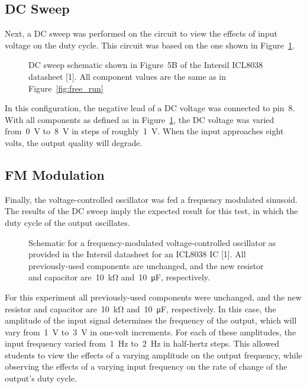 \subsection{DC Sweep}
Next, a DC sweep was performed on the circuit to view the effects of input
voltage on the duty cycle.  This circuit was based on the one shown in
Figure~\ref{fig:dc_sweep}.
%
\begin{figure}[H]
	\centering
	
	\parbox{.6\textwidth}{
	\caption{DC sweep schematic shown in Figure~5B of the Intersil ICL8038
	datasheet [1].  All component values are the same as in
	Figure~\ref{fig:free_run}}
	\label{fig:dc_sweep}}
\end{figure}
%
In this configuration, the negative lead of a DC voltage was connected to pin~8.
With all components as defined as in Figure~\ref{fig:dc_sweep}, the DC voltage
was varied from~\SI{0}{\volt} to~\SI{8}{\volt} in steps of
roughly~\SI{1}{\volt}.  When the input approaches eight volts, the output
quality will degrade.

\subsection{FM Modulation}
Finally, the voltage-controlled oscillator was fed a frequency modulated
sinusoid.  The results of the DC sweep imply the expected result for
this test, in which the duty cycle of the output oscillates.
%
\begin{figure}[H]
	\centering
	
	\parbox{.6\textwidth}{
	\caption{Schematic for a frequency-modulated voltage-controlled oscillator
	as provided in the Intersil datasheet for an ICL8038 IC [1].  All
	previously-used components are unchanged, and the new resistor and
	capacitor are~\SI{10}{\kilo\ohm} and~\SI{10}{\micro\farad}, respectively.}
	\label{fig:freq_mod}}
\end{figure}
%
For this experiment all previously-used components were unchanged, and the new
resistor and capacitor are~\SI{10}{\kilo\ohm} and~\SI{10}{\micro\farad},
respectively.  In this case, the amplitude of the input signal determines the
frequency of the output, which will vary from~\SI{1}{\volt} to~\SI{3}{\volt} in
one-volt increments.  For each of these amplitudes, the input frequency
varied from~\SI{1}{\hertz} to~\SI{2}{\hertz} in half-hertz steps.  This allowed
students to view the effects of a varying amplitude on the output frequency,
while observing the effects of a varying input frequency on the rate of change
of the output's duty cycle.
